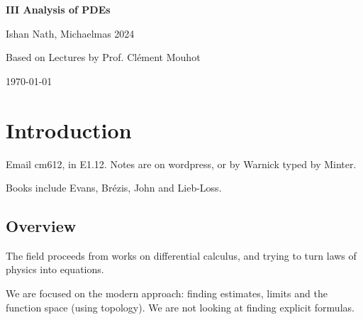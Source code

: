 \documentclass[12pt]{article}
\begin{document}
\hypersetup{pageanchor=false}
\begin{titlepage}
	\begin{center}
		\vspace*{1em}
		\Huge
		\textbf{III Analysis of PDEs}

		\vspace{1em}
		\large
		Ishan Nath, Michaelmas 2024

		\vspace{1.5em}

		\Large

		Based on Lectures by Prof. Cl\'ement Mouhot

		\vspace{1em}

		\large
		\today
	\end{center}
	
\end{titlepage}
\hypersetup{pageanchor=true}

\tableofcontents

\newpage


\setcounter{section}{-1}

\section{Introduction}%
\label{sec:intro}

Email cm612, in E1.12. Notes are on wordpress, or by Warnick typed by Minter.

Books include Evans, Br\'ezis, John and Lieb-Loss.

\subsection{Overview}%
\label{sub:over}

The field proceeds from works on differential calculus, and trying to turn laws of physics into equations.

We are focused on the modern approach: finding estimates, limits and the function space (using topology). We are not looking at finding explicit formulas.
\end{document}

